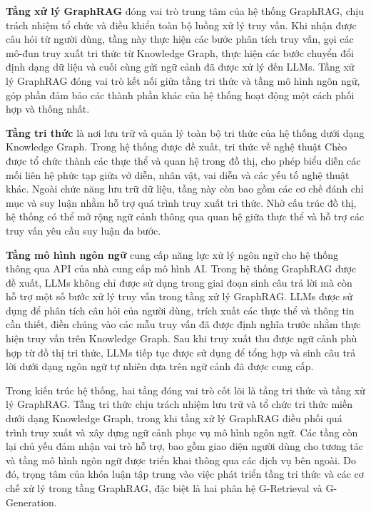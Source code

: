 \textbf{Tầng xử lý GraphRAG} đóng vai trò trung tâm của hệ thống GraphRAG, chịu trách nhiệm tổ chức và điều khiển toàn bộ luồng xử lý truy vấn. Khi nhận được câu hỏi từ người dùng, tầng này thực hiện các bước phân tích truy vấn, gọi các mô-đun truy xuất tri thức từ Knowledge Graph, thực hiện các bước chuyển đổi định dạng dữ liệu và cuối cùng gửi ngữ cảnh đã được xử lý đến LLMs. Tầng xử lý GraphRAG đóng vai trò kết nối giữa tầng tri thức và tầng mô hình ngôn ngữ, góp phần đảm bảo các thành phần khác của hệ thống hoạt động một cách phối hợp và thống nhất.

\textbf{Tầng tri thức} là nơi lưu trữ và quản lý toàn bộ tri thức của hệ thống dưới dạng Knowledge Graph. Trong hệ thống được đề xuất, tri thức về nghệ thuật Chèo được tổ chức thành các thực thể và quan hệ trong đồ thị, cho phép biểu diễn các mối liên hệ phức tạp giữa vở diễn, nhân vật, vai diễn và các yếu tố nghệ thuật khác. Ngoài chức năng lưu trữ dữ liệu, tầng này còn bao gồm các cơ chế đánh chỉ mục và suy luận nhằm hỗ trợ quá trình truy xuất tri thức. Nhờ cấu trúc đồ thị, hệ thống có thể mở rộng ngữ cảnh thông qua quan hệ giữa thực thể và hỗ trợ các truy vấn yêu cầu suy luận đa bước.

\textbf{Tầng mô hình ngôn ngữ} cung cấp năng lực xử lý ngôn ngữ cho hệ thống thông qua API của nhà cung cấp mô hình AI. Trong hệ thống GraphRAG được đề xuất, LLMs không chỉ được sử dụng trong giai đoạn sinh câu trả lời mà còn hỗ trợ một số bước xử lý truy vấn trong tầng xử lý GraphRAG. LLMs được sử dụng để phân tích câu hỏi của người dùng, trích xuất các thực thể và thông tin cần thiết, điền chúng vào các mẫu truy vấn đã được định nghĩa trước nhằm thực hiện truy vấn trên Knowledge Graph. Sau khi truy xuất thu được ngữ cảnh phù hợp từ đồ thị tri thức, LLMs tiếp tục được sử dụng để tổng hợp và sinh câu trả lời dưới dạng ngôn ngữ tự nhiên dựa trên ngữ cảnh đã được cung cấp.

Trong kiến trúc hệ thống, hai tầng đóng vai trò cốt lõi là tầng tri thức và tầng xử lý GraphRAG. Tầng tri thức chịu trách nhiệm lưu trữ và tổ chức tri thức miền dưới dạng Knowledge Graph, trong khi tầng xử lý GraphRAG điều phối quá trình truy xuất và xây dựng ngữ cảnh phục vụ mô hình ngôn ngữ. Các tầng còn lại chủ yếu đảm nhận vai trò hỗ trợ, bao gồm giao diện người dùng cho tương tác và tầng mô hình ngôn ngữ được triển khai thông qua các dịch vụ bên ngoài. Do đó, trọng tâm của khóa luận tập trung vào việc phát triển tầng tri thức và các cơ chế xử lý trong tầng GraphRAG, đặc biệt là hai phân hệ G-Retrieval và G-Generation.

